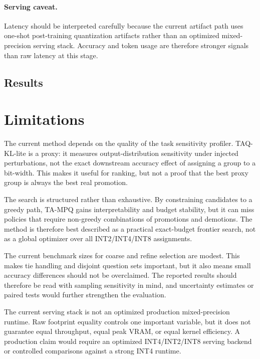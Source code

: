\documentclass{article}
\newcommand{\method}{TA-MPQ}
\newcommand{\inttwo}{INT2}
\newcommand{\intfour}{INT4}
\newcommand{\inteight}{INT8}
\begin{document}
\paragraph{Serving caveat.}
Latency should be interpreted carefully because the current artifact path uses one-shot post-training quantization artifacts rather than an optimized mixed-precision serving stack. Accuracy and token usage are therefore stronger signals than raw latency at this stage.

\subsection{Results}
\label{sec:results}



\section{Limitations}

The current method depends on the quality of the task sensitivity profiler. TAQ-KL-lite is a proxy: it measures output-distribution sensitivity under injected perturbations, not the exact downstream accuracy effect of assigning a group to a bit-width. This makes it useful for ranking, but not a proof that the best proxy group is always the best real promotion.

The search is structured rather than exhaustive. By constraining candidates to a greedy path, \method{} gains interpretability and budget stability, but it can miss policies that require non-greedy combinations of promotions and demotions. The method is therefore best described as a practical exact-budget frontier search, not as a global optimizer over all \inttwo{}/\intfour{}/\inteight{} assignments.

The current benchmark sizes for coarse and refine selection are modest. This makes tie handling and disjoint question sets important, but it also means small accuracy differences should not be overclaimed. The reported results should therefore be read with sampling sensitivity in mind, and uncertainty estimates or paired tests would further strengthen the evaluation.

The current serving stack is not an optimized production mixed-precision runtime. Raw footprint equality controls one important variable, but it does not guarantee equal throughput, equal peak VRAM, or equal kernel efficiency. A production claim would require an optimized \intfour{}/\inttwo{}/\inteight{} serving backend or controlled comparisons against a strong \intfour{} runtime.
\end{document}
